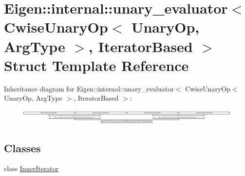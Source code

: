 \hypertarget{struct_eigen_1_1internal_1_1unary__evaluator_3_01_cwise_unary_op_3_01_unary_op_00_01_arg_type_01_4_00_01_iterator_based_01_4}{}\section{Eigen\+:\+:internal\+:\+:unary\+\_\+evaluator$<$ Cwise\+Unary\+Op$<$ Unary\+Op, Arg\+Type $>$, Iterator\+Based $>$ Struct Template Reference}
\label{struct_eigen_1_1internal_1_1unary__evaluator_3_01_cwise_unary_op_3_01_unary_op_00_01_arg_type_01_4_00_01_iterator_based_01_4}
Inheritance diagram for Eigen\+:\+:internal\+:\+:unary\+\_\+evaluator$<$ Cwise\+Unary\+Op$<$ Unary\+Op, Arg\+Type $>$, Iterator\+Based $>$\+:\begin{figure}[H]
\begin{center}
\leavevmode
\includegraphics[height=0.800000cm]{struct_eigen_1_1internal_1_1unary__evaluator_3_01_cwise_unary_op_3_01_unary_op_00_01_arg_type_01_4_00_01_iterator_based_01_4}
\end{center}
\end{figure}
\subsection*{Classes}
\begin{DoxyCompactItemize}
\item 
class \hyperlink{class_eigen_1_1internal_1_1unary__evaluator_3_01_cwise_unary_op_3_01_unary_op_00_01_arg_type_01_629bdbe0b310981fdaf6bb6b6c73ef55}{Inner\+Iterator}
\end{DoxyCompactItemize}
